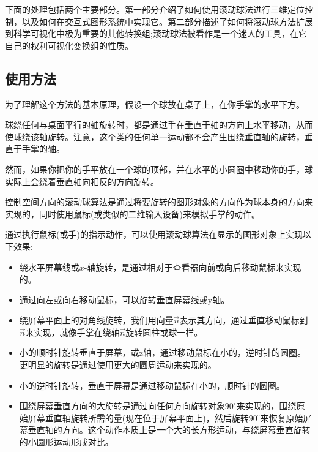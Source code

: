\begin{CJK}{UTF8}{gbsn}
下面的处理包括两个主要部分。第一部分介绍了如何使用滚动球法进行三维定位控制，以及如何在交互式图形系统中实现它。第二部分描述了如何将滚动球方法扩展到科学可视化中极为重要的其他转换组;滚动球法被看作是一个迷人的工具，在它自己的权利可视化变换组的性质。



\subsection*{使用方法}
为了理解这个方法的基本原理，假设一个球放在桌子上，在你手掌的水平下方。


球绕任何与桌面平行的轴旋转时，都是通过手在垂直于轴的方向上水平移动，从而使球绕该轴旋转。注意，这个类的任何单一运动都不会产生围绕垂直轴的旋转，垂直于手掌的轴。


然而，如果你把你的手平放在一个球的顶部，并在水平的小圆圈中移动你的手，球实际上会绕着垂直轴向相反的方向旋转。


控制空间方向的滚动球算法是通过将要旋转的图形对象的方向作为球本身的方向来实现的，同时使用鼠标(或类似的二维输入设备)来模拟手掌的动作。


通过执行鼠标(或手)的指示动作，可以使用滚动球算法在显示的图形对象上实现以下效果:


\begin{itemize}

\item 绕水平屏幕线或$x$-轴旋转，是通过相对于查看器向前或向后移动鼠标来实现的。


\item 通过向左或向右移动鼠标，可以旋转垂直屏幕线或y轴。


\item 绕屏幕平面上的对角线旋转，我们用向量$\vec{n}$表示其方向，通过垂直移动鼠标到$\vec{n}$来实现，就像手掌在绕轴$\vec{n}$旋转圆柱或球一样。


\item 小的顺时针旋转垂直于屏幕，或z轴，通过移动鼠标在小的，逆时针的圆圈。更明显的旋转是通过使用更大的圆周运动来实现的。


\item 小的逆时针旋转，垂直于屏幕是通过移动鼠标在小的，顺时针的圆圈。


\item 围绕屏幕垂直方向的大旋转是通过向任何方向旋转对象$90^{\circ}$来实现的，围绕原始屏幕垂直轴旋转所需的量(现在位于屏幕平面上)，然后旋转$90^{\circ}$来恢复原始屏幕垂直轴的方向。这个动作本质上是一个大的长方形运动，与绕屏幕垂直旋转的小圆形运动形成对比。


\end{itemize}


\end{CJK}
